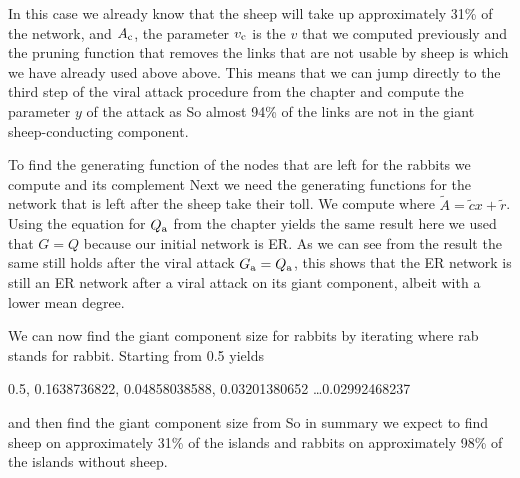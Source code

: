 In this case we already know that the sheep will take up approximately 31\% of the network, and $A_{\rm c}$, the parameter $v_{\rm c}$ is the $v$ that we computed previously and the pruning function that removes the links that are not usable by sheep is 
which we have already used above above. This means that we can jump directly to the third step of the viral attack procedure from the chapter and compute the parameter $y$ of the attack as 
So almost 94\% of the links are not in the giant sheep-conducting component.

To find the generating function of the nodes that are left for the rabbits we compute
and its complement
Next we need the generating functions for the network that is left after the sheep take their toll. We compute 
where $\tilde{A}=\tilde{c}x+\tilde{r}$. Using the equation for $Q_{\rm a}$ from the chapter yields the same result
here we used that $G=Q$ because our initial network is ER. As we can see from the result the same still holds after the viral attack $G_{\rm a}=Q_{\rm a}$, this shows that the ER network is still an ER network after a viral attack on its giant component, albeit with a lower mean degree. 

We can now find the giant component size for rabbits by iterating 
where rab stands for rabbit. Starting from 0.5 yields 
\begin{center}
    0.5, 0.1638736822, 0.04858038588, 0.03201380652 \ldots 0.02992468237 
\end{center}
and then find the giant component size from
So in summary we expect to find sheep on approximately 31\% of the islands and rabbits on approximately 98\% of the islands without sheep.   
